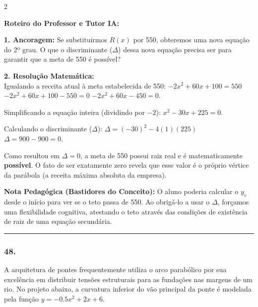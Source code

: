 \begin{multicols*}{2}
\ifgabarito
    \begin{tcolorbox}[colback=CorTitUm!5, colframe=CorTitUm, boxrule=1pt, arc=4pt, left=6pt, right=6pt, top=6pt, bottom=6pt]
    \small\textbf{\textcolor{CorTitUm}{Roteiro do Professor e Tutor IA:}}\par\vspace{0.1cm}
    \color{CinzaEscuro}
    \textbf{1. Ancoragem:} Se substituirmos $R(x)$ por 550, obteremos uma nova equação do 2º grau. O que o discriminante ($\Delta$) dessa nova equação precisa ser para garantir que a meta de 550 é possível?\par\vspace{0.1cm}
    \textbf{2. Resolução Matemática:}\\
    Igualando a receita atual à meta estabelecida de 550:
    $-2x^2 + 60x + 100 = 550$
    $-2x^2 + 60x + 100 - 550 = 0$
    $-2x^2 + 60x - 450 = 0$.
    
    Simplificando a equação inteira (dividindo por $-2$):
    $x^2 - 30x + 225 = 0$.
    
    Calculando o discriminante ($\Delta$):
    $\Delta = (-30)^2 - 4(1)(225)$
    $\Delta = 900 - 900 = 0$.
    
    Como resultou em $\Delta = 0$, a meta de 550 possui raiz real e é matematicamente \textbf{possível}. O fato de ser exatamente zero revela que esse valor é o próprio vértice da parábola (a receita máxima absoluta da empresa).
    \end{tcolorbox}
    \vspace{0.15cm}
    
    \begin{boxexplicacao}
    \textbf{Nota Pedagógica (Bastidores do Conceito):} O aluno poderia calcular o $y_v$ desde o início para ver se o teto passa de 550. Ao obrigá-lo a usar o $\Delta$, forçamos uma flexibilidade cognitiva, atestando o teto através das condições de existência de raiz de uma equação secundária.
    \end{boxexplicacao}
\fi

\par\vspace{\espacoQuestao}

\noindent\textcolor{CorLinha}{\rule{\linewidth}{0.5pt}} 
\par\vspace{\espacoPreQuestao}
\subsubsection*{48.} 
\begin{enunciadoLiteral}
A arquitetura de pontes frequentemente utiliza o arco parabólico por sua excelência em distribuir tensões estruturais para as fundações nas margens de um rio. No projeto abaixo, a curvatura inferior do vão principal da ponte é modelada pela função $y = -0.5x^2 + 2x + 6$.


\end{enunciadoLiteral}
\end{multicols*}
